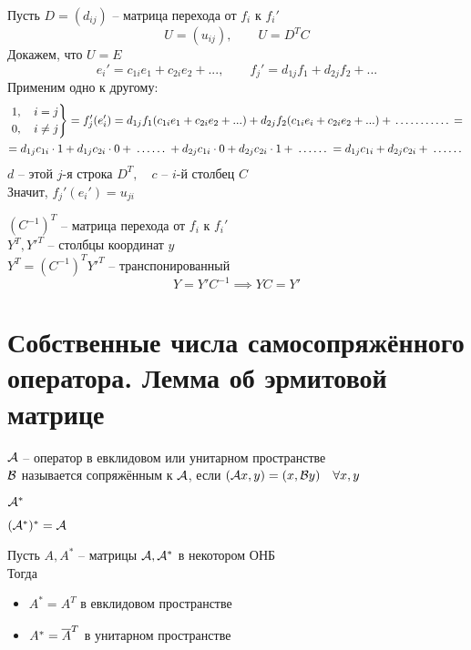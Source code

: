 \begin{eproof}
	\item Пусть $ D = (d_{ij}) $ -- матрица перехода от $ f_i $ к $ f_i' $
	$$ U = (u_{ij}), \qquad U = D^TC $$
	Докажем, что $ U = E $
	$$ e_i' = c_{1i}e_1 + c_{2i}e_2 + ..., \qquad f_j' = d_{1j}f_1 + d_{2j}f_2 + ... $$
	Применим одно к другому:
	\begin{multline*}
		\begin{rcases}
			1, \quad i = j \\
			0, \quad i \ne j
		\end{rcases} = f_j'(e_i') = d_{1j}f_1(c_{1i}e_1 + c_{2i}e_2 + ...) + d_{2j}f_2(c_{1i}e_i + c_{2i}e_2 + ...) + \widedots[5em] = \\
		= d_{1j}c_{1i} \cdot 1 + d_{1j}c_{2i} \cdot 0 + \widedots[3em] + d_{2j}c_{1i} \cdot 0 + d_{2j}c_{2i} \cdot 1 + \widedots[3em] = d_{1j}c_{1i} + d_{2j}c_{2i} + \widedots[3em]
	\end{multline*}
	$ d $ -- этой $ j $-я строка $ D^T, \quad c $ -- $ i $-й столбец $ C $ \\
	Значит, $ f_j'(e_i') = u_{ji} $

	\item $ (C^{-1})^T $ -- матрица перехода от $ f_i $ к $ f_i' $ \\
	$ Y^T, Y'^T $ -- столбцы координат $ y $ \\
	$ Y^T = (C^{-1})^TY'^T $ -- транспонированный
	$$ Y = Y'C^{-1} \implies YC = Y' $$
\end{eproof}

\section{Собственные числа самосопряжённого оператора. Лемма об эрмитовой матрице}

\begin{definition}
	$ \mathcal{A} $ -- оператор в евклидовом или унитарном пространстве \\
	$ \mathcal{B} $ называется сопряжённым к $ \mathcal{A} $, если $ (\mathcal{A}x, y) = (x, \mathcal{B}y) \quad \forall x, y $
\end{definition}

\begin{notation}
	$ \mathcal{A}^* $
\end{notation}

\begin{props}
	\item $ (\mathcal{A}^*)^* = \mathcal{A} $
	\item Пусть $ A, A^* $ -- матрицы $ \mathcal{A}, \mathcal{A}^* $ в некотором ОНБ \\
	Тогда
	\begin{itemize}
		\item $ A^* = A^T $ в евклидовом пространстве
		\item $ A^* = \overline{A}^T $ в унитарном пространстве
	\end{itemize}
\end{props}

